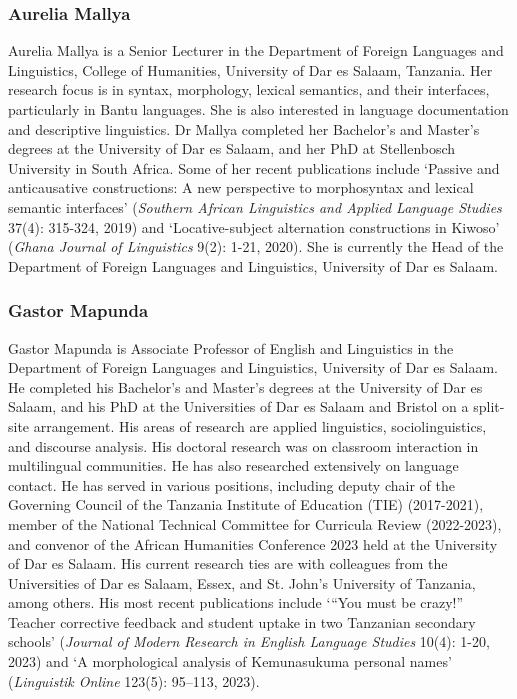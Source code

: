\subsubsection*{Aurelia Mallya }
Aurelia Mallya is a Senior Lecturer in the Department of Foreign Languages and Linguistics, College of Humanities, University of Dar es Salaam, Tanzania. Her research focus is in syntax, morphology, lexical semantics, and their interfaces, particularly in Bantu languages. She is also interested in language documentation and descriptive linguistics. Dr Mallya completed her Bachelor's and Master's degrees at the University of Dar es Salaam, and her PhD at Stellenbosch University in South Africa. Some of her recent publications include ‘Passive and anticausative constructions: A new perspective to morphosyntax and lexical semantic interfaces’ (\textit{Southern African Linguistics and Applied Language Studies} 37(4): 315-324, 2019) and ‘Locative-subject alternation constructions in Kiwoso’ (\textit{Ghana Journal of Linguistics} 9(2): 1-21, 2020). She is currently the Head of the Department of Foreign Languages and Linguistics, University of Dar es Salaam.

\subsubsection*{Gastor Mapunda }
Gastor Mapunda is Associate Professor of English and Linguistics in the Department of Foreign Languages and Linguistics, University of Dar es Salaam. He completed his Bachelor’s and Master’s degrees at the University of Dar es Salaam, and his PhD at the Universities of Dar es Salaam and Bristol on a split-site arrangement. His areas of research are applied linguistics, sociolinguistics, and discourse analysis. His doctoral research was on classroom interaction in multilingual communities. He has also researched extensively on language contact. He has served in various positions, including deputy chair of the Governing Council of the Tanzania Institute of Education (TIE) (2017-2021), member of the National Technical Committee for Curricula Review (2022-2023), and convenor of the African Humanities  {Conference 2023} held at the University of Dar es Salaam. His current research ties are with colleagues from the Universities of Dar es Salaam, Essex, and St. John’s University of Tanzania, among others. His most recent publications include ‘“You must be crazy!” Teacher corrective feedback and student uptake in two Tanzanian secondary schools’ (\textit{Journal of Modern Research in English Language Studies} 10(4): 1-20, 2023) and ‘A morphological analysis of Kemunasukuma personal names’ (\textit{Linguistik Online} 123(5): 95–113, 2023).

